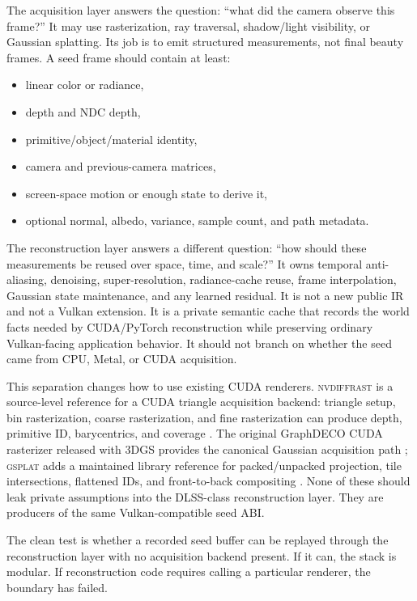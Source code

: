 \documentclass[11pt]{article}
\begin{document}
The acquisition layer answers the question: ``what did the camera observe this
frame?'' It may use rasterization, ray traversal, shadow/light visibility, or
Gaussian splatting. Its job is to emit structured measurements, not final
beauty frames. A seed frame should contain at least:

\begin{itemize}
  \item linear color or radiance,
  \item depth and NDC depth,
  \item primitive/object/material identity,
  \item camera and previous-camera matrices,
  \item screen-space motion or enough state to derive it,
  \item optional normal, albedo, variance, sample count, and path metadata.
\end{itemize}

The reconstruction layer answers a different question: ``how should these
measurements be reused over space, time, and scale?'' It owns temporal
anti-aliasing, denoising, super-resolution, radiance-cache reuse, frame
interpolation, Gaussian state maintenance, and any learned residual. It is not
a new public IR and not a Vulkan extension. It is a private semantic cache that
records the world facts needed by CUDA/PyTorch reconstruction while preserving
ordinary Vulkan-facing application behavior. It should not branch on whether
the seed came from CPU, Metal, or CUDA acquisition.

This separation changes how to use existing CUDA renderers. \textsc{nvdiffrast}
is a source-level reference for a CUDA triangle acquisition backend: triangle
setup, bin rasterization, coarse rasterization, and fine rasterization can
produce depth, primitive ID, barycentrics, and coverage
\cite{laine2020nvdiffrast}. The original GraphDECO CUDA rasterizer released
with 3DGS provides the canonical Gaussian acquisition path
\cite{kerbl2023gs}; \textsc{gsplat} adds a maintained library reference for
packed/unpacked projection, tile intersections, flattened IDs, and
front-to-back compositing \cite{ye2024gsplat}. None of these should leak
private assumptions into the DLSS-class reconstruction layer. They are
producers of the same Vulkan-compatible seed ABI.

The clean test is whether a recorded seed buffer can be replayed through the
reconstruction layer with no acquisition backend present. If it can, the stack
is modular. If reconstruction code requires calling a particular renderer, the
boundary has failed.
\end{document}
